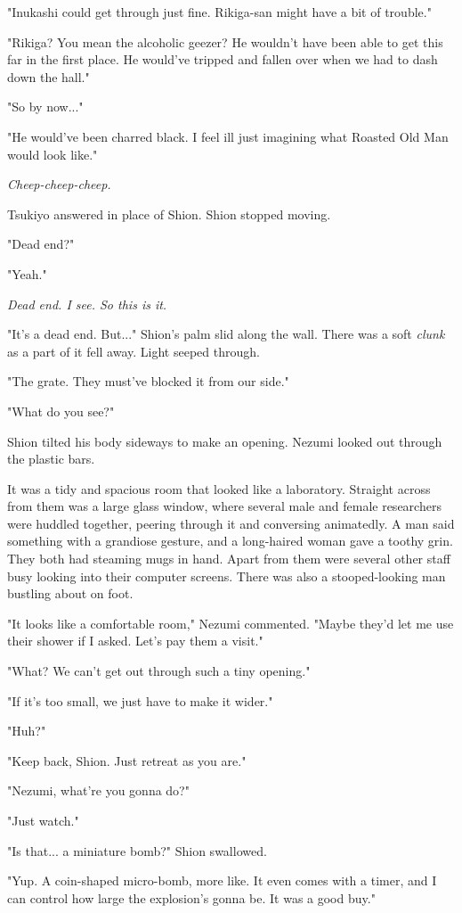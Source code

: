 "Inukashi could get through just fine. Rikiga-san might have a bit of
trouble."

"Rikiga? You mean the alcoholic geezer? He wouldn't have been able to
get this far in the first place. He would've tripped and fallen over
when we had to dash down the hall."

"So by now..."

"He would've been charred black. I feel ill just imagining what Roasted
Old Man would look like."

\emph{Cheep-cheep-cheep.}

Tsukiyo answered in place of Shion. Shion stopped moving.

"Dead end?"

"Yeah."

\emph{Dead end. I see. So this is it.}

"It's a dead end. But..." Shion's palm slid along the wall. There was a
soft \emph{clunk} as a part of it fell away. Light seeped through.

"The grate. They must've blocked it from our side."

"What do you see?"

Shion tilted his body sideways to make an opening. Nezumi looked out
through the plastic bars.

It was a tidy and spacious room that looked like a laboratory. Straight
across from them was a large glass window, where several male and female
researchers were huddled together, peering through it and conversing
animatedly. A man said something with a grandiose gesture, and a
long-haired woman gave a toothy grin. They both had steaming mugs in
hand. Apart from them were several other staff busy looking into their
computer screens. There was also a stooped-looking man bustling about on
foot.

"It looks like a comfortable room," Nezumi commented. "Maybe they'd let
me use their shower if I asked. Let's pay them a visit."

"What? We can't get out through such a tiny opening."

"If it's too small, we just have to make it wider."

"Huh?"

"Keep back, Shion. Just retreat as you are."

"Nezumi, what're you gonna do?"

"Just watch."

"Is that... a miniature bomb?" Shion swallowed.

"Yup. A coin-shaped micro-bomb, more like. It even comes with a timer,
and I can control how large the explosion's gonna be. It was a good
buy."

